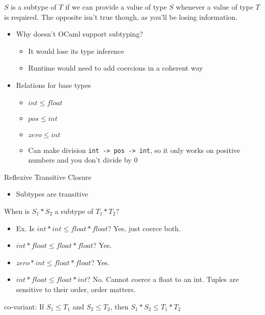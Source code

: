 \documentclass[11pt]{article}
\begin{document}
\(S\) is a subtype of \(T\) if we can provide a value of type \(S\) whenever a value of type \(T\) is required. The opposite isn't true though, as you'll be losing information.
\begin{itemize}
\item Why doesn't OCaml support subtyping?
\begin{itemize}
\item It would lose its type inference
\item Runtime would need to add coercions in a coherent way
\end{itemize}
\item Relations for base types
\begin{itemize}
\item \(int \leq float\)
\item \(pos \leq int\)
\item \(zero \leq int\)
\item Can make division \texttt{int -> pos -> int}, so it only works on positive numbers and you don't divide by \(0\)
\end{itemize}
\end{itemize}
Reflexive Transitive Closure
\begin{itemize}
\item Subtypes are transitive
\end{itemize}
When is \(S_1 * S_2\) a subtype of \(T_1 * T_2\)?
\begin{itemize}
\item Ex. Is \(int * int \leq float * float\)? Yes, just coerce both.
\item \(int * float \leq float * float\)? Yes.
\item \(zero * int \leq float * float\)? Yes.
\item \(int * float \leq float * int\)? No. Cannot coerce a float to an int. Tuples are sensitive to their order, order matters.
\end{itemize}
co-variant: If \(S_1 \leq T_1\) and \(S_2 \leq T_2\), then \(S_1 * S_2 \leq T_1 * T_2\)
\end{document}

